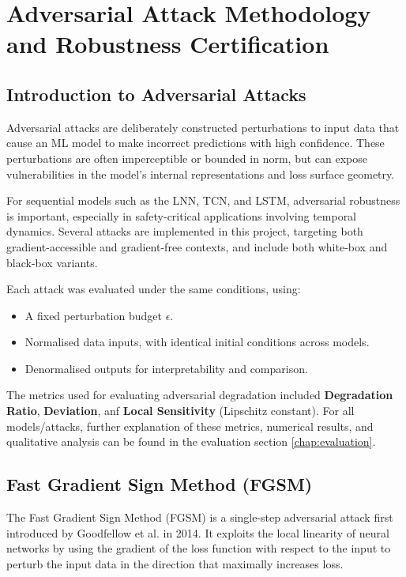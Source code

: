 \chapter{Adversarial Attack Methodology and Robustness Certification}

\section{Introduction to Adversarial Attacks}

Adversarial attacks are deliberately constructed perturbations to input data that cause an ML model to make incorrect predictions with high confidence. These perturbations are often imperceptible or bounded in norm, but can expose vulnerabilities in the model's internal representations and loss surface geometry.

For sequential models such as the LNN, TCN, and LSTM, adversarial robustness is important, especially in safety-critical applications involving temporal dynamics. Several attacks are implemented in this project, targeting both gradient-accessible and gradient-free contexts, and include both white-box and black-box variants.

Each attack was evaluated under the same conditions, using:
\begin{itemize}
    \item A fixed perturbation budget $\epsilon$.
    \item Normalised data inputs, with identical initial conditions across models.
    \item Denormalised outputs for interpretability and comparison.
\end{itemize}

The metrics used for evaluating adversarial degradation included \textbf{Degradation Ratio}, \textbf{Deviation}, anf \textbf{Local Sensitivity} (Lipschitz constant). For all models/attacks, further explanation of these metrics, numerical results, and qualitative analysis can be found in the evaluation section \ref{chap:evaluation}.

\section{Fast Gradient Sign Method (FGSM)}

The Fast Gradient Sign Method (FGSM) is a single-step adversarial attack first introduced by Goodfellow et al.\cite{goodfellow2015explaining} in 2014. It exploits the local linearity of neural networks by using the gradient of the loss function with respect to the input to perturb the input data in the direction that maximally increases loss.

